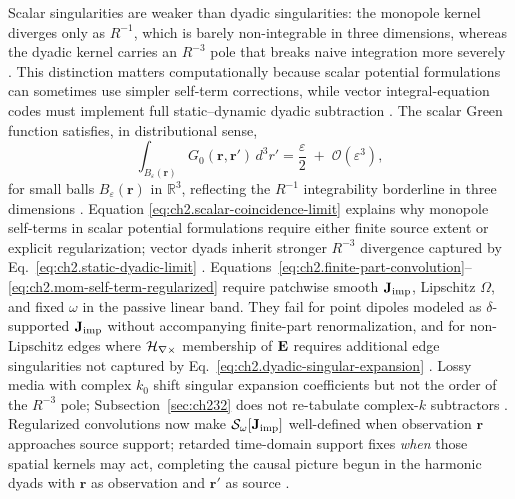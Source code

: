 Scalar singularities are weaker than dyadic singularities: the monopole kernel diverges only
as $R^{-1}$, which is barely non-integrable in three dimensions, whereas the dyadic kernel
carries an $R^{-3}$ pole that breaks naive integration more severely \cite{jackson1999}. This
distinction matters computationally because scalar potential formulations can sometimes use
simpler self-term corrections, while vector integral-equation codes must implement full static--dynamic
dyadic subtraction \cite{harrington2001}. The scalar Green function satisfies, in distributional sense,
\begin{equation}
\label{eq:ch2.scalar-coincidence-limit}
\int_{B_{\varepsilon}(\mathbf{r})}
G_0(\mathbf{r},\mathbf{r}')\,d^{3}r'
=
\frac{\varepsilon}{2}
\;+\;\mathcal{O}(\varepsilon^{3}),
\end{equation}
for small balls \(B_{\varepsilon}(\mathbf{r})\) in \(\mathbb{R}^{3}\), reflecting the
\(R^{-1}\) integrability borderline in three dimensions \cite{jackson1999}. Equation
\eqref{eq:ch2.scalar-coincidence-limit} explains why monopole self-terms in scalar
potential formulations require either finite source extent or explicit regularization;
vector dyads inherit stronger \(R^{-3}\) divergence captured by
Eq.~\eqref{eq:ch2.static-dyadic-limit} \cite{stratton1941}.
Equations~\eqref{eq:ch2.finite-part-convolution}--\eqref{eq:ch2.mom-self-term-regularized}
require patchwise smooth \(\mathbf{J}_{\mathrm{imp}}\), Lipschitz \(\Omega\), and fixed \(\omega\) in the
passive linear band. They fail for point dipoles modeled as \(\delta\)-supported
\(\mathbf{J}_{\mathrm{imp}}\) without accompanying finite-part renormalization, and for non-Lipschitz
edges where \(\mathcal{H}_{\nabla\times}\) membership of \(\mathbf{E}\) requires additional edge singularities not captured by Eq.~\eqref{eq:ch2.dyadic-singular-expansion}
\cite{stratton1941}. Lossy media with complex \(k_0\) shift singular
expansion coefficients but not the order of the \(R^{-3}\) pole; Subsection~\ref{sec:ch232}
does not re-tabulate complex-\(k\) subtractors \cite{stratton1941}. Regularized convolutions
now make $\mathcal{S}_\omega[\mathbf{J}_{\mathrm{imp}}]$ well-defined when observation $\mathbf{r}$ approaches source
support; retarded time-domain support fixes \emph{when} those spatial kernels may act, completing
the causal picture begun in the harmonic dyads with $\mathbf{r}$ as observation and $\mathbf{r}'$
as source \cite{stratton1941}.
